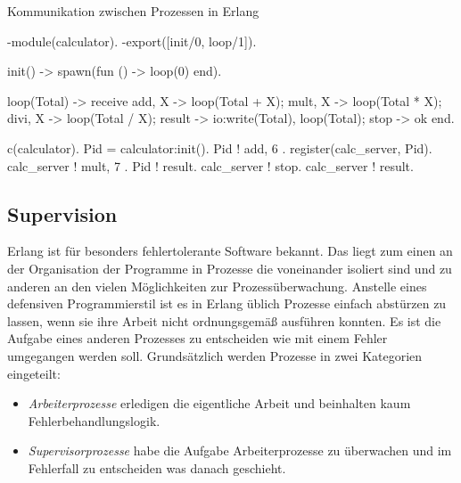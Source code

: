 \begin{program}[!hbt]
\caption{Kommunikation zwischen Prozessen in Erlang}
\label{prog:erlang-processes}
\noindent\begin{minipage}[t]{.52\textwidth}
\lstset{showlines=true}
\begin{ErlangCode}
-module(calculator).
-export([init/0, loop/1]).

init() ->
  spawn(fun () -> loop(0) end).

loop(Total) ->
  receive
    { add,  X } -> loop(Total + X);
    { mult, X } -> loop(Total * X);
		{ divi, X } -> loop(Total / X);
    result      -> io:write(Total),
									 loop(Total);
    stop    		-> ok
  end.
\end{ErlangCode}

\end{minipage}\hfill
\begin{minipage}[t]{.44\textwidth}
\lstset{showlines=true}
\begin{ErlangCode}
c(calculator). %
Pid = calculator:init().
Pid ! { add, 6 }.
register(calc_server, Pid).
calc_server ! { mult, 7 }.
Pid ! result. %
calc_server ! stop.
calc_server ! result.

\end{ErlangCode}

\end{minipage}
\end{program}

\subsection{Supervision}

Erlang ist für besonders fehlertolerante Software bekannt. Das liegt zum einen an der Organisation der Programme in  Prozesse die voneinander isoliert sind und zu anderen an den vielen Möglichkeiten zur Prozessüberwachung. Anstelle eines defensiven Programmierstil ist es in Erlang üblich Prozesse einfach abstürzen zu lassen, wenn sie ihre Arbeit nicht ordnungsgemäß ausführen konnten. Es ist die Aufgabe eines anderen Prozesses zu entscheiden wie mit einem Fehler umgegangen werden soll. Grundsätzlich werden Prozesse in zwei Kategorien eingeteilt:

\begin{itemize}
	\item \textit{Arbeiterprozesse} erledigen die eigentliche Arbeit und beinhalten kaum Fehlerbehandlungslogik.
	\item \textit{Supervisorprozesse} habe die Aufgabe Arbeiterprozesse zu überwachen und im Fehlerfall zu entscheiden was danach geschieht.
\end{itemize}

